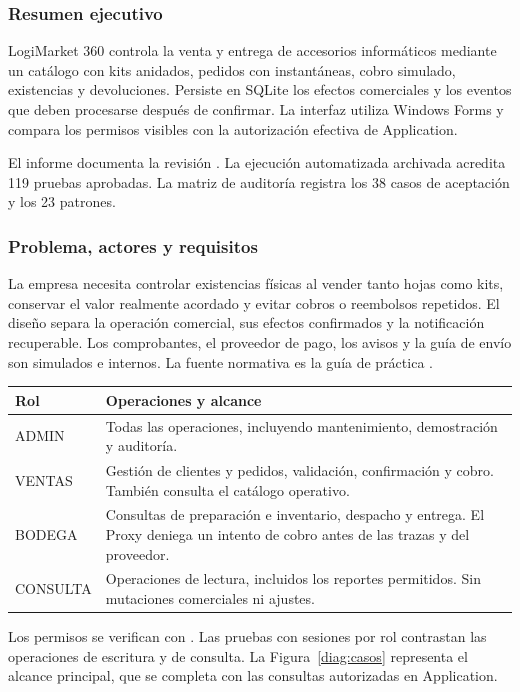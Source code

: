 \subsubsection{Resumen ejecutivo}
LogiMarket 360 controla la venta y entrega de accesorios informáticos mediante un catálogo con kits anidados, pedidos con instantáneas, cobro simulado, existencias y devoluciones. Persiste en SQLite los efectos comerciales y los eventos que deben procesarse después de confirmar. La interfaz utiliza Windows Forms y compara los permisos visibles con la autorización efectiva de Application.

El informe documenta la revisión . La ejecución automatizada archivada acredita 119 pruebas aprobadas. La matriz de auditoría registra los 38 casos de aceptación y los 23 patrones.

\subsubsection{Problema, actores y requisitos}
La empresa necesita controlar existencias físicas al vender tanto hojas como kits, conservar el valor realmente acordado y evitar cobros o reembolsos repetidos. El diseño separa la operación comercial, sus efectos confirmados y la notificación recuperable. Los comprobantes, el proveedor de pago, los avisos y la guía de envío son simulados e internos. La fuente normativa es la guía de práctica \cite{ape04}.


\begin{longtable}{@{}L{.19\linewidth}L{.76\linewidth}@{}}
\toprule Rol & Operaciones y alcance \\ \midrule\endhead
ADMIN & Todas las operaciones, incluyendo mantenimiento, demostración y auditoría. \\
VENTAS & Gestión de clientes y pedidos, validación, confirmación y cobro. También consulta el catálogo operativo. \\
BODEGA & Consultas de preparación e inventario, despacho y entrega. El Proxy deniega un intento de cobro antes de las trazas y del proveedor. \\
CONSULTA & Operaciones de lectura, incluidos los reportes permitidos. Sin mutaciones comerciales ni ajustes. \\
\bottomrule
\end{longtable}
\noindent Los permisos se verifican con . Las pruebas con sesiones por rol contrastan las operaciones de escritura y de consulta. La Figura~\ref{diag:casos} representa el alcance principal, que se completa con las consultas autorizadas en Application.

